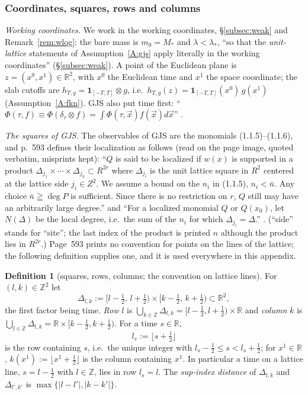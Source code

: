 \documentclass[11pt,a4paper]{article}
\theoremstyle{plain}
\theoremstyle{definition}
\theoremstyle{plain}
\theoremstyle{definition}
\newtheorem{auxdef}[auxlemma]{Definition}
\newcommand{\R}{\mathbb{R}}
\newcommand{\Z}{\mathbb{Z}}
\begin{document}
\subsubsection{Coordinates, squares, rows and columns}\label{sec:notation-squares}

\emph{Working coordinates.}  We work in the working coordinates, \S\ref{subsec:weak} and Remark~\ref{rem:wlog}: the bare mass is $m_0=M_*$ and
$\lambda<\lambda_*$, ``so that the \emph{unit-lattice} statements of Assumption~\ref{A:gjs} apply
literally in the working coordinates'' (\S\ref{subsec:weak}).  A point of the Euclidean plane is
$z=(x^0,x^1)\in\R^2$, with $x^0$ the Euclidean time and $x^1$ the space coordinate; the
slab cutoffs are $h_{T,g}=\mathbf 1_{[-T,T]}\otimes g$, i.e.\
$h_{T,g}(z)=\mathbf 1_{[-T,T]}(x^0)\,g(x^1)$ (Assumption~\ref{A:fkn}).  GJS also put
time first: ``$\Phi(\tau,f)\equiv\Phi(\delta_\tau\otimes f)=\int\Phi(\tau,\vec x)f(\vec
x)d\vec x$'' \cite[p.~589]{GJS}.

\emph{The squares of GJS.}  The observables of GJS are the monomials (1.1.5)--(1.1.6), and
p.~593 defines their localization as follows (read on the page image, quoted verbatim,
misprints kept): ``$Q$ is said to be localized if $w(x)$ is supported in a product
$\Delta_{j_1}\times\cdots\times\Delta_{j_n}\subset R^{2r}$ where $\Delta_{j_i}$ is the unit
lattice square in $R^2$ centered at the lattice side $j_i\in Z^2$. We assume a bound on the
$n_i$ in (1.1.5), $n_i<\bar n$. Any choice $\bar n\geqq\deg P$ is sufficient. Since there is
no restriction on $r$, $Q$ still may have an arbitrarily large degree.'' and ``For a
localized monomial $Q$ or $Q(x_0)$, let $N(\Delta)$ be the local degree, i.e.\ the sum of
the $n_i$ for which $\Delta_{j_i}=\Delta$.'' \cite[p.~593]{GJS}.  (``side'' stands for
``site''; the last index of the product is printed $n$ although the product lies in
$R^{2r}$.)  Page~593 prints no convention for points on the lines of the lattice; the
following definition supplies one, and it is used everywhere in this appendix.

\begin{auxdef}[squares, rows, columns; the convention on lattice lines]\label{aux:notation-squares}
For $(l,k)\in\Z^2$ let
\[
 \Delta_{l,k}:=[l-\tfrac12,\,l+\tfrac12)\times[k-\tfrac12,\,k+\tfrac12)\subset\R^2 ,
\]
the first factor being time.  \emph{Row} $l$ is $\bigcup_{k\in\Z}\Delta_{l,k}=[l-\frac12,
l+\frac12)\times\R$ and \emph{column} $k$ is $\bigcup_{l\in\Z}\Delta_{l,k}=\R\times
[k-\frac12,k+\frac12)$.  For a time $s\in\R$,
\[
 l_s:=\lfloor s+\tfrac12\rfloor
\]
is the row containing $s$, i.e.\ the unique integer with $l_s-\frac12\le s<l_s+\frac12$;
for $x^1\in\R$, $k(x^1):=\lfloor x^1+\frac12\rfloor$ is the column containing $x^1$.  In
particular a time on a lattice line, $s=l-\frac12$ with $l\in\Z$, lies in row $l_s=l$.  The
\emph{sup-index distance} of $\Delta_{l,k}$ and $\Delta_{l',k'}$ is
$\max\{|l-l'|,|k-k'|\}$.
\end{auxdef}
\end{document}
